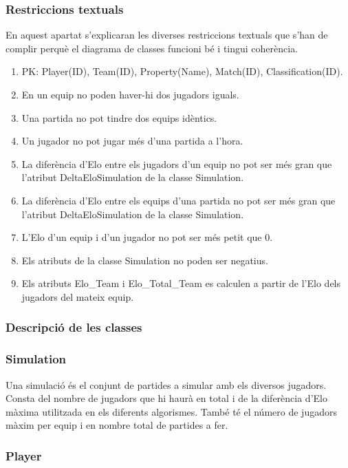 \documentclass[a4paper]{article}
\begin{document}
\subsubsection{Restriccions textuals}
En aquest apartat s'explicaran les diverses restriccions textuals que s'han de complir perquè el diagrama de classes funcioni bé i tingui coherència.
\begin{enumerate}
    \item PK: Player(ID), Team(ID), Property(Name), Match(ID), Classification(ID).
    \item En un equip no poden haver-hi dos jugadors iguals.
    \item Una partida no pot tindre dos equips idèntics.
    \item Un jugador no pot jugar més d'una partida a l'hora.
    \item La diferència d'Elo entre els jugadors d'un equip no pot ser més gran que l'atribut DeltaEloSimulation  de la classe Simulation.
    \item La diferència d'Elo entre els equips d'una partida no pot ser més gran que l'atribut DeltaEloSimulation  de la classe Simulation.
    \item L'Elo d'un equip i d'un jugador no pot ser més petit que 0.
    \item Els atributs de la classe Simulation no poden ser negatius.
    \item Els atributs Elo\_Team i Elo\_Total\_Team es calculen a partir de l'Elo dels jugadors del mateix equip.
\end{enumerate}

\subsubsection{Descripció de les classes}

\subsubsection*{Simulation}

Una simulació és el conjunt de partides a simular amb els diversos jugadors. Consta del nombre de jugadors que hi haurà en total i de la diferència d'Elo màxima utilitzada en els diferents algorismes. També té el número de jugadors màxim per equip i en nombre total de partides a fer.

\subsubsection*{Player}
\end{document}
